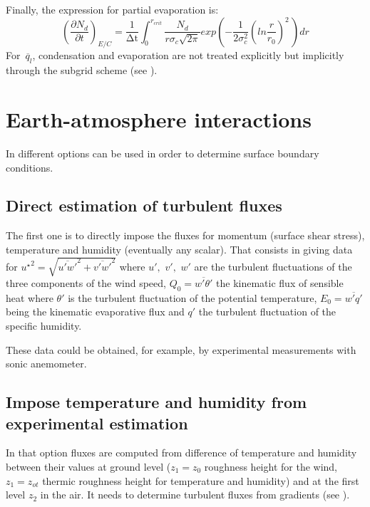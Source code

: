 Finally, the expression for partial evaporation is:
\begin{equation}
\left( \frac{\partial N_{d}}{\partial t}
\right)_{E/C}=\frac{1}{\mathrm{\Delta t}}\int_{0}^{r_{crit}}
\frac{N_{d}}{r\sigma_{c}\sqrt {2\pi } } exp\left( -\frac{1}{2\sigma
_{c}^{2}}\left( ln\frac{r}{r_{0}} \right)^{2}\, \right)dr
\end{equation}
For $\overline{{\, q}_{l}}$, condensation and evaporation are not treated
explicitly but implicitly through the subgrid scheme (see \cite{Bouzereau:2007}).

\section{Earth-atmosphere interactions}
In \CS different options can be used in order to
determine surface boundary conditions.

\subsection{Direct estimation of turbulent fluxes}
The first one is to directly impose the fluxes for momentum (surface shear stress), temperature and
humidity (eventually any scalar). That consists in giving data for
${u^{\star}} ^2 =\sqrt {\overline {u'w'}^{2}+\overline {v'w'}^{2}} $ where
$u',\,\,v',\,\,w'$ are the turbulent fluctuations of
the three components of the wind speed,
\newline
\newline
$Q_{0} =\overline{w'\theta'}$ the kinematic flux of sensible heat where
$\theta '$ is the turbulent fluctuation of the potential temperature,
\newline
\newline
$E_{0} =\overline {w'q'} $ being the kinematic
evaporative flux and $q'$ the turbulent fluctuation of the specific
humidity.

These data could be obtained, for example, by experimental
measurements with sonic anemometer.

\subsection{Impose temperature and humidity from experimental estimation}
In that option fluxes are computed from difference of temperature and
humidity between their values at ground level ($z_{1}=z_{0}$ roughness
height for the wind, $z_{1}=z_{ot}$ thermic roughness height for
temperature and humidity) and at the first level $z_{2}$ in the air.
It needs to determine turbulent fluxes from gradients (see \cite{Musson_Genon:2007}).

